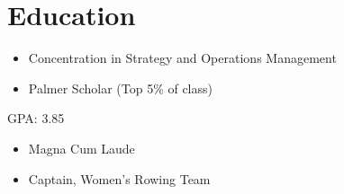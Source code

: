 
\section{Education}




\begin{itemize}

  \item Concentration in Strategy and Operations Management

  \item Palmer Scholar (Top 5\% of class)

\end{itemize}





GPA: 3.85


\begin{itemize}

  \item Magna Cum Laude

  \item Captain, Women's Rowing Team

\end{itemize}




